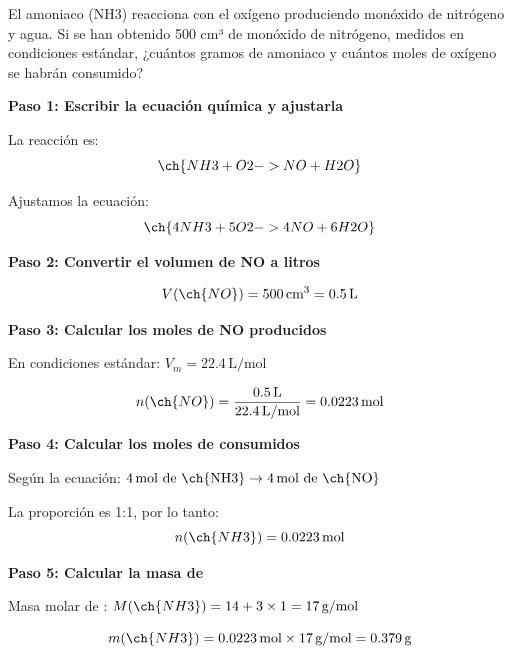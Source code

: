 \begin{exercise}
    El amoniaco (NH3) reacciona con el oxígeno produciendo monóxido de nitrógeno y agua. Si
    se han obtenido 500 cm³ de monóxido de nitrógeno, medidos en condiciones estándar,
    ¿cuántos gramos de amoniaco y cuántos moles de oxígeno se habrán consumido?
    \begin{solu}
        \textbf{Paso 1: Escribir la ecuación química y ajustarla}

        La reacción es:
        \begin{equation*}
            \ch{NH3 + O2 -> NO + H2O}
        \end{equation*}

        Ajustamos la ecuación:
        \begin{equation*}
            \ch{4 NH3 + 5 O2 -> 4 NO + 6 H2O}
        \end{equation*}

        \textbf{Paso 2: Convertir el volumen de NO a litros}

        \begin{equation*}
            V(\ch{NO}) = 500\,\text{cm}^3 = 0.5\,\text{L}
        \end{equation*}

        \textbf{Paso 3: Calcular los moles de NO producidos}

        En condiciones estándar: $V_m = 22.4\,\text{L/mol}$

        \begin{equation*}
            n(\ch{NO}) = \frac{0.5\,\text{L}}{22.4\,\text{L/mol}} = 0.0223\,\text{mol}
        \end{equation*}

        \textbf{Paso 4: Calcular los moles de  consumidos}

        Según la ecuación: $4\,\text{mol de \ch{NH3}} \rightarrow 4\,\text{mol de \ch{NO}}$

        La proporción es 1:1, por lo tanto:
        \begin{equation*}
            n(\ch{NH3}) = 0.0223\,\text{mol}
        \end{equation*}

        \textbf{Paso 5: Calcular la masa de }

        Masa molar de : $M(\ch{NH3}) = 14 + 3 \times 1 = 17\,\text{g/mol}$

        \begin{equation*}
            m(\ch{NH3}) = 0.0223\,\text{mol} \times 17\,\text{g/mol} = 0.379\,\text{g}
        \end{equation*}


\end{solu}
\end{exercise}
